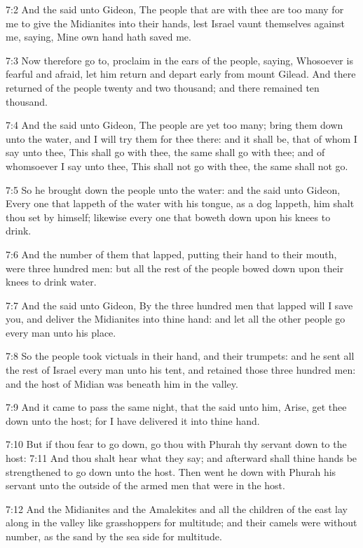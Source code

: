 7:2 And the \LORD said unto Gideon, The people that are with thee are
too many for me to give the Midianites into their hands, lest Israel
vaunt themselves against me, saying, Mine own hand hath saved me.

7:3 Now therefore go to, proclaim in the ears of the people, saying,
Whosoever is fearful and afraid, let him return and depart early from
mount Gilead. And there returned of the people twenty and two
thousand; and there remained ten thousand.

7:4 And the \LORD said unto Gideon, The people are yet too many; bring
them down unto the water, and I will try them for thee there: and it
shall be, that of whom I say unto thee, This shall go with thee, the
same shall go with thee; and of whomsoever I say unto thee, This shall
not go with thee, the same shall not go.

7:5 So he brought down the people unto the water: and the \LORD said
unto Gideon, Every one that lappeth of the water with his tongue, as a
dog lappeth, him shalt thou set by himself; likewise every one that
boweth down upon his knees to drink.

7:6 And the number of them that lapped, putting their hand to their
mouth, were three hundred men: but all the rest of the people bowed
down upon their knees to drink water.

7:7 And the \LORD said unto Gideon, By the three hundred men that
lapped will I save you, and deliver the Midianites into thine hand:
and let all the other people go every man unto his place.

7:8 So the people took victuals in their hand, and their trumpets: and
he sent all the rest of Israel every man unto his tent, and retained
those three hundred men: and the host of Midian was beneath him in the
valley.

7:9 And it came to pass the same night, that the \LORD said unto him,
Arise, get thee down unto the host; for I have delivered it into thine
hand.

7:10 But if thou fear to go down, go thou with Phurah thy servant down
to the host: 7:11 And thou shalt hear what they say; and afterward
shall thine hands be strengthened to go down unto the host. Then went
he down with Phurah his servant unto the outside of the armed men that
were in the host.

7:12 And the Midianites and the Amalekites and all the children of the
east lay along in the valley like grasshoppers for multitude; and
their camels were without number, as the sand by the sea side for
multitude.

